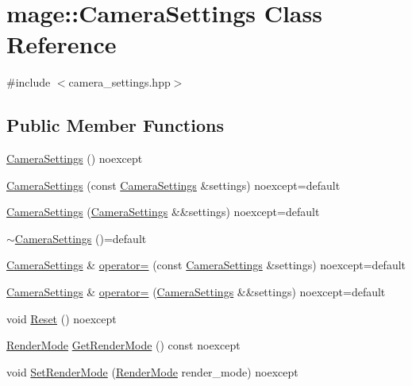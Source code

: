 \hypertarget{classmage_1_1_camera_settings}{}\section{mage\+:\+:Camera\+Settings Class Reference}
\label{classmage_1_1_camera_settings}


{\ttfamily \#include $<$camera\+\_\+settings.\+hpp$>$}

\subsection*{Public Member Functions}
\begin{DoxyCompactItemize}
\item 
\hyperlink{classmage_1_1_camera_settings_aaade0b72e225ace41e903fcf8108094c}{Camera\+Settings} () noexcept
\item 
\hyperlink{classmage_1_1_camera_settings_a651ea29eb3050113c0d1b9d0594ed123}{Camera\+Settings} (const \hyperlink{classmage_1_1_camera_settings}{Camera\+Settings} \&settings) noexcept=default
\item 
\hyperlink{classmage_1_1_camera_settings_af69f6271c0a84441ed2012ab9feaae47}{Camera\+Settings} (\hyperlink{classmage_1_1_camera_settings}{Camera\+Settings} \&\&settings) noexcept=default
\item 
\hyperlink{classmage_1_1_camera_settings_a738a93dc2e1aed2cac7a58af658984f3}{$\sim$\+Camera\+Settings} ()=default
\item 
\hyperlink{classmage_1_1_camera_settings}{Camera\+Settings} \& \hyperlink{classmage_1_1_camera_settings_a970b1250eaef3a47cd0264d15a114db5}{operator=} (const \hyperlink{classmage_1_1_camera_settings}{Camera\+Settings} \&settings) noexcept=default
\item 
\hyperlink{classmage_1_1_camera_settings}{Camera\+Settings} \& \hyperlink{classmage_1_1_camera_settings_a201c68e760a9d05e7ee4b76288dcf8b6}{operator=} (\hyperlink{classmage_1_1_camera_settings}{Camera\+Settings} \&\&settings) noexcept=default
\item 
void \hyperlink{classmage_1_1_camera_settings_a4894cae6954c111339be554e8dd9562c}{Reset} () noexcept
\item 
\hyperlink{namespacemage_a9d24b35ed0bdecf8535e2b91fe0eebba}{Render\+Mode} \hyperlink{classmage_1_1_camera_settings_a6673291bcfed8fa2c0a0041bf8f97f24}{Get\+Render\+Mode} () const noexcept
\item 
void \hyperlink{classmage_1_1_camera_settings_ab0d6720a08e88e018c2a2e6097933d98}{Set\+Render\+Mode} (\hyperlink{namespacemage_a9d24b35ed0bdecf8535e2b91fe0eebba}{Render\+Mode} render\+\_\+mode) noexcept

\end{DoxyCompactItemize}
